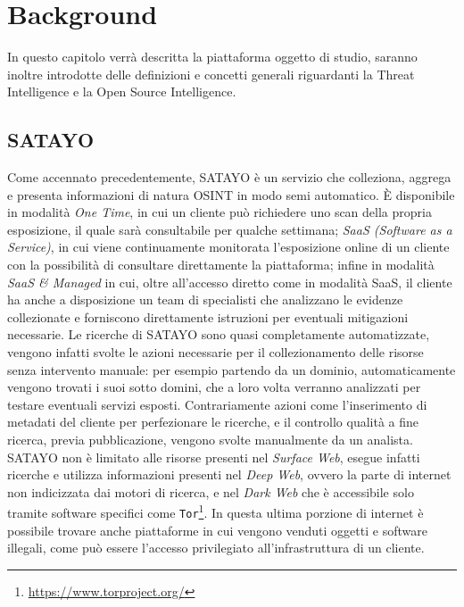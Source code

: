 \chapter{Background}
\label{cha:background}

In questo capitolo verrà descritta la piattaforma oggetto di studio, saranno inoltre
introdotte delle definizioni e concetti generali riguardanti la Threat Intelligence
e la Open Source Intelligence.

\section{SATAYO}
\label{sec:satayo}

Come accennato precedentemente, SATAYO\cite{satayo} è un servizio che colleziona,
aggrega e presenta informazioni di natura OSINT in modo semi automatico. È
disponibile in modalità \textit{One Time}, in cui un cliente può richiedere uno
scan della propria esposizione, il quale sarà consultabile per qualche settimana;
\textit{SaaS (Software as a Service)}, in cui viene continuamente monitorata l'esposizione
online di un cliente con la possibilità di consultare direttamente la
piattaforma; infine in modalità \textit{SaaS \& Managed} in cui, oltre all'accesso
diretto come in modalità SaaS, il cliente ha anche a disposizione un team di
specialisti che analizzano le evidenze collezionate e forniscono direttamente
istruzioni per eventuali mitigazioni necessarie. Le ricerche di SATAYO sono quasi
completamente automatizzate, vengono infatti svolte le azioni necessarie per il
collezionamento delle risorse senza intervento manuale: per esempio partendo da un
dominio, automaticamente vengono trovati i suoi sotto domini, che a loro volta verranno
analizzati per testare eventuali servizi esposti. Contrariamente azioni come l'inserimento
di metadati del cliente per perfezionare le ricerche, e il controllo qualità a fine
ricerca, previa pubblicazione, vengono svolte manualmente da un analista. SATAYO
non è limitato alle risorse presenti nel \textit{Surface Web}\cite{Kavallieros2021},
esegue infatti ricerche e utilizza informazioni presenti nel \textit{Deep Web}, ovvero
la parte di internet non indicizzata dai motori di ricerca, e nel \textit{Dark
Web} che è accessibile solo tramite software specifici come \texttt{Tor}\footnote{\url{https://www.torproject.org/}}.
In questa ultima porzione di internet è possibile trovare anche piattaforme in
cui vengono venduti oggetti e software illegali, come può essere l'accesso privilegiato
all'infrastruttura di un cliente.

